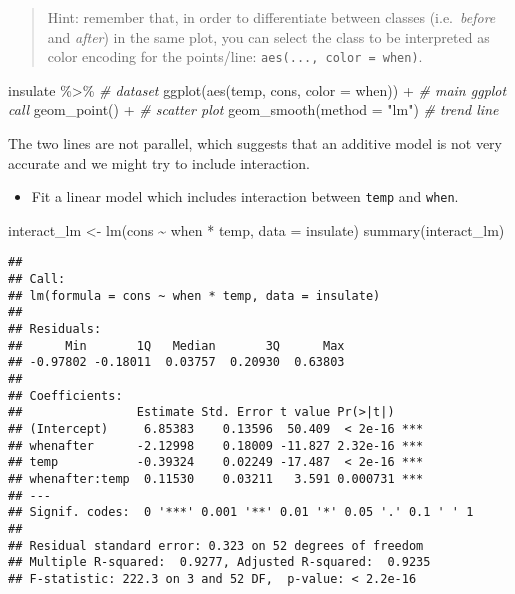 \documentclass[
  oneside]{book}
\newenvironment{Shaded}{\begin{snugshade}}{\end{snugshade}}
\newcommand{\AttributeTok}[1]{\textcolor[rgb]{0.77,0.63,0.00}{#1}}
\newcommand{\CommentTok}[1]{\textcolor[rgb]{0.56,0.35,0.01}{\textit{#1}}}
\newcommand{\FunctionTok}[1]{\textcolor[rgb]{0.00,0.00,0.00}{#1}}
\newcommand{\NormalTok}[1]{#1}
\newcommand{\OtherTok}[1]{\textcolor[rgb]{0.56,0.35,0.01}{#1}}
\newcommand{\SpecialCharTok}[1]{\textcolor[rgb]{0.00,0.00,0.00}{#1}}
\newcommand{\StringTok}[1]{\textcolor[rgb]{0.31,0.60,0.02}{#1}}
\providecommand{\tightlist}{%
  \setlength{\itemsep}{0pt}\setlength{\parskip}{0pt}}
\begin{document}
\begin{quote}
Hint: remember that, in order to differentiate between
classes (i.e.~\emph{before} and \emph{after}) in the same plot,
you can select the class to be interpreted as color encoding
for the points/line: \texttt{aes(...,\ color\ =\ when)}.
\end{quote}

\begin{Shaded}
\begin{Highlighting}[]
\NormalTok{insulate }\SpecialCharTok{\%\textgreater{}\%} \CommentTok{\# dataset}
  \FunctionTok{ggplot}\NormalTok{(}\FunctionTok{aes}\NormalTok{(temp, cons, }\AttributeTok{color =}\NormalTok{ when)) }\SpecialCharTok{+} \CommentTok{\# main ggplot call}
  \FunctionTok{geom\_point}\NormalTok{() }\SpecialCharTok{+} \CommentTok{\# scatter plot}
  \FunctionTok{geom\_smooth}\NormalTok{(}\AttributeTok{method =} \StringTok{"lm"}\NormalTok{) }\CommentTok{\# trend line}
\end{Highlighting}
\end{Shaded}

The two lines are not parallel, which suggests that an additive model
is not very accurate and we might try to include interaction.

\begin{itemize}
\tightlist
\item
  Fit a linear model which includes interaction between \texttt{temp} and \texttt{when}.
\end{itemize}

\begin{Shaded}
\begin{Highlighting}[]
\NormalTok{interact\_lm }\OtherTok{\textless{}{-}} \FunctionTok{lm}\NormalTok{(cons }\SpecialCharTok{\textasciitilde{}}\NormalTok{ when }\SpecialCharTok{*}\NormalTok{ temp, }\AttributeTok{data =}\NormalTok{ insulate)}
\FunctionTok{summary}\NormalTok{(interact\_lm)}
\end{Highlighting}
\end{Shaded}

\begin{verbatim}
## 
## Call:
## lm(formula = cons ~ when * temp, data = insulate)
## 
## Residuals:
##      Min       1Q   Median       3Q      Max 
## -0.97802 -0.18011  0.03757  0.20930  0.63803 
## 
## Coefficients:
##                Estimate Std. Error t value Pr(>|t|)    
## (Intercept)     6.85383    0.13596  50.409  < 2e-16 ***
## whenafter      -2.12998    0.18009 -11.827 2.32e-16 ***
## temp           -0.39324    0.02249 -17.487  < 2e-16 ***
## whenafter:temp  0.11530    0.03211   3.591 0.000731 ***
## ---
## Signif. codes:  0 '***' 0.001 '**' 0.01 '*' 0.05 '.' 0.1 ' ' 1
## 
## Residual standard error: 0.323 on 52 degrees of freedom
## Multiple R-squared:  0.9277, Adjusted R-squared:  0.9235 
## F-statistic: 222.3 on 3 and 52 DF,  p-value: < 2.2e-16
\end{verbatim}
\end{document}
